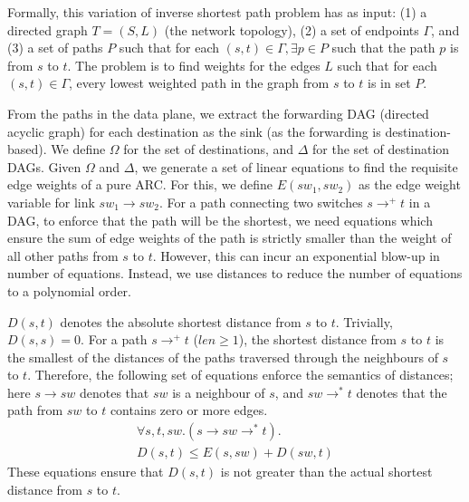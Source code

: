 Formally, this variation of inverse shortest path problem 
has as input: (1) a directed graph $T = (S, L)$ (the network topology), 
(2) a set of endpoints $\Gamma$, and 
(3) a set of paths $P$
such that for each $(s,t) \in \Gamma, \exists p \in P$ such
that the path $p$ is from $s$ to $t$. 
The problem is to find weights for the edges $L$ such that 
for each $(s,t) \in \Gamma$, every lowest weighted path 
in the graph 
from $s$ to $t$ is in set $P$. 

From the paths in the data plane, 
we extract the forwarding
DAG (directed acyclic graph) for each destination
as the sink (as the forwarding is destination-based). 
We define $\Omega$ for the 
set of destinations, and $\Delta$ for  
the set of destination DAGs. 
Given $\Omega$ and $\Delta$, we generate a set of linear equations
to find the requisite edge weights of a pure ARC. 
For this, we define $E(sw_1, sw_2)$ as
the edge weight variable for link $sw_1 \rightarrow sw_2$. 
For a path connecting two switches 
$s \rightarrow^+ t$ in a DAG, 
to enforce that the path will be the shortest, we need equations
which ensure the sum of edge weights of the path is strictly smaller than
the weight of all other paths from $s$ to $t$. However, this can incur
an exponential blow-up in number of equations. Instead, we use distances 
to reduce the number of equations to a polynomial order. 

$D(s,t)$ denotes the absolute shortest distance from $s$ to $t$. 
Trivially, $D(s,s) = 0$. For a path $s \rightarrow^+ t$ ($len \geq 1$),
the shortest distance from $s$ to $t$ is the smallest of the distances
of the paths traversed through the neighbours of $s$ to $t$. Therefore, the
following set of equations enforce the semantics of distances; 
here $s \rightarrow sw$ denotes that $sw$ is a neighbour
of $s$, and $sw \rightarrow^* t$ denotes that the path from $sw$ to $t$ contains
zero or more edges.
\begin{multline} \label{eq:dist}
\forall s, t, sw. (s \rightarrow sw \rightarrow^* t).\\
D(s, t) \leq E(s, sw) + D(sw, t)
\end{multline}
These equations ensure that $D(s,t)$ is not greater than 
the actual shortest distance from $s$ to $t$.

